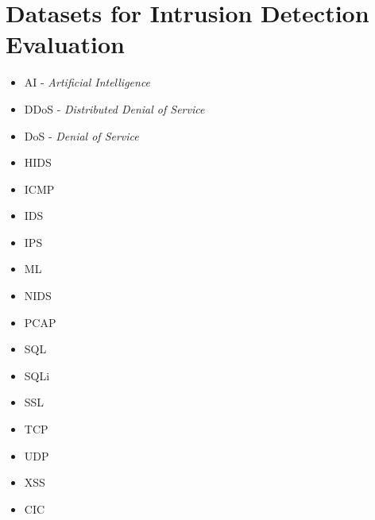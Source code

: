 \chapter{Datasets for Intrusion Detection Evaluation}

\begin{itemize}
    \item[\faCaretRight] AI - \textit{Artificial Intelligence}
    \item[\faCaretRight] DDoS - \textit{Distributed Denial of Service}
    \item[\faCaretRight] DoS - \textit{Denial of Service}
    \item[\faCaretRight] HIDS
    \item[\faCaretRight] ICMP
    \item[\faCaretRight] IDS
    \item[\faCaretRight] IPS
    \item[\faCaretRight] ML
    \item[\faCaretRight] NIDS
    \item[\faCaretRight] PCAP
    \item[\faCaretRight] SQL
    \item[\faCaretRight] SQLi
    \item[\faCaretRight] SSL
    \item[\faCaretRight] TCP
    \item[\faCaretRight] UDP
    \item[\faCaretRight] XSS
    \item[\faCaretRight] CIC
\end{itemize}